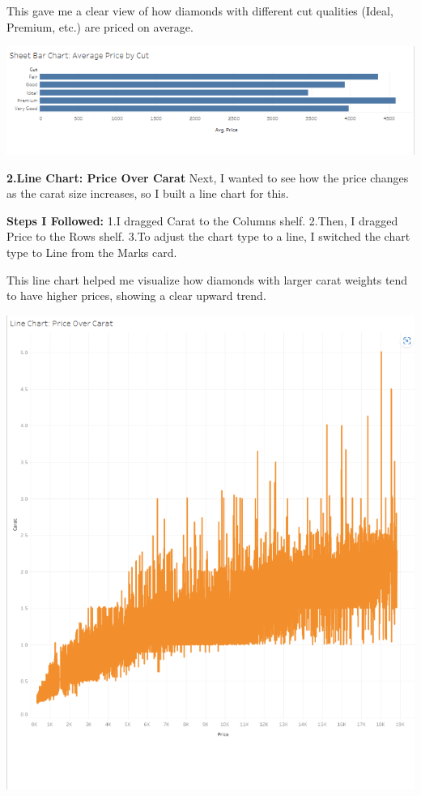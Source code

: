 \documentclass[
  letterpaper,
  DIV=11,
  numbers=noendperiod]{scrreprt}
\begin{document}
This gave me a clear view of how diamonds with different cut qualities
(Ideal, Premium, etc.) are priced on average.

\includegraphics{Bar Chart_Average Price by Cut_Olufawo.png}

\textbf{2.Line Chart: Price Over Carat} Next, I wanted to see how the
price changes as the carat size increases, so I built a line chart for
this.

\textbf{Steps I Followed:} 1.I dragged Carat to the Columns shelf.
2.Then, I dragged Price to the Rows shelf. 3.To adjust the chart type to
a line, I switched the chart type to Line from the Marks card.

This line chart helped me visualize how diamonds with larger carat
weights tend to have higher prices, showing a clear upward trend.

\includegraphics{Line Chart_Price Over Carat.png}
\end{document}
